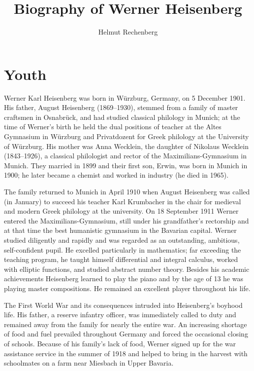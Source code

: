 \documentclass{article}
\title{Biography of Werner Heisenberg}
\author{Helmut Rechenberg}
\date{}
\begin{document}
\maketitle

\tableofcontents

\section{Youth}

Werner Karl Heisenberg was born in Würzburg, Germany, on 5 December 1901. His father, August Heisenberg (1869--1930), stemmed from a family of master craftsmen in Osnabrück, and had studied classical philology in Munich; at the time of Werner's birth he held the dual positions of teacher at the Altes Gymnasium in Würzburg and Privatdozent for Greek philology at the University of Würzburg. His mother was Anna Wecklein, the daughter of Nikolaus Wecklein (1843--1926), a classical philologist and rector of the Maximilians-Gymnasium in Munich. They married in 1899 and their first son, Erwin, was born in Munich in 1900; he later became a chemist and worked in industry (he died in 1965).

The family returned to Munich in April 1910 when August Heisenberg was called (in January) to succeed his teacher Karl Krumbacher in the chair for medieval and modern Greek philology at the university. On 18 September 1911 Werner entered the Maximilians-Gymnasium, still under his grandfather's rectorship and at that time the best humanistic gymnasium in the Bavarian capital. Werner studied diligently and rapidly and was regarded as an outstanding, ambitious, self-confident pupil. He excelled particularly in mathematics; far exceeding the teaching program, he taught himself differential and integral calculus, worked with elliptic functions, and studied abstract number theory. Besides his academic achievements Heisenberg learned to play the piano and by the age of 13 he was playing master compositions. He remained an excellent player throughout his life.

The First World War and its consequences intruded into Heisenberg's boyhood life. His father, a reserve infantry officer, was immediately called to duty and remained away from the family for nearly the entire war. An increasing shortage of food and fuel prevailed throughout Germany and forced the occasional closing of schools. Because of his family's lack of food, Werner signed up for the war assistance service in the summer of 1918 and helped to bring in the harvest with schoolmates on a farm near Miesbach in Upper Bavaria.
\end{document}

